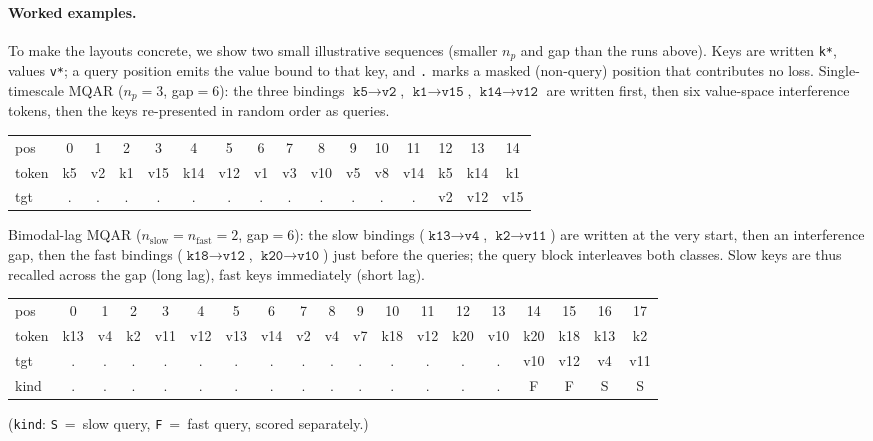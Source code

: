 \documentclass[11pt,letterpaper,logo]{yalearxiv}
\begin{document}
\paragraph{Worked examples.} To make the layouts concrete, we show two small
illustrative sequences (smaller $n_p$ and gap than the runs above). Keys are
written \texttt{k*}, values \texttt{v*}; a query position emits the value bound to
that key, and \texttt{.} marks a masked (non-query) position that contributes no
loss. Single-timescale MQAR ($n_p{=}3$, gap${=}6$): the three bindings
$\texttt{k5}{\to}\texttt{v2}$, $\texttt{k1}{\to}\texttt{v15}$,
$\texttt{k14}{\to}\texttt{v12}$ are written first, then six value-space
interference tokens, then the keys re-presented in random order as queries.
\begin{center}\small\ttfamily\setlength{\tabcolsep}{3pt}
\begin{tabular}{@{}l *{15}{c}@{}}
pos   & 0 & 1 & 2 & 3 & 4 & 5 & 6 & 7 & 8 & 9 & 10 & 11 & 12 & 13 & 14\\
token & k5 & v2 & k1 & v15 & k14 & v12 & v1 & v3 & v10 & v5 & v8 & v14 & k5 & k14 & k1\\
tgt   & . & . & . & . & . & . & . & . & . & . & . & . & v2 & v12 & v15\\
\end{tabular}
\end{center}
Bimodal-lag MQAR ($n_{\text{slow}}{=}n_{\text{fast}}{=}2$, gap${=}6$): the slow
bindings ($\texttt{k13}{\to}\texttt{v4}$, $\texttt{k2}{\to}\texttt{v11}$) are
written at the very start, then an interference gap, then the fast bindings
($\texttt{k18}{\to}\texttt{v12}$, $\texttt{k20}{\to}\texttt{v10}$) just before the
queries; the query block interleaves both classes. Slow keys are thus recalled
across the gap (long lag), fast keys immediately (short lag).
\begin{center}\footnotesize\ttfamily\setlength{\tabcolsep}{3pt}
\begin{tabular}{@{}l *{18}{c}@{}}
pos   & 0 & 1 & 2 & 3 & 4 & 5 & 6 & 7 & 8 & 9 & 10 & 11 & 12 & 13 & 14 & 15 & 16 & 17\\
token & k13 & v4 & k2 & v11 & v12 & v13 & v14 & v2 & v4 & v7 & k18 & v12 & k20 & v10 & k20 & k18 & k13 & k2\\
tgt   & . & . & . & . & . & . & . & . & . & . & . & . & . & . & v10 & v12 & v4 & v11\\
kind  & . & . & . & . & . & . & . & . & . & . & . & . & . & . & F & F & S & S\\
\end{tabular}
\end{center}
(\texttt{kind}: \texttt{S}~=~slow query, \texttt{F}~=~fast query, scored
separately.)




\end{document}
